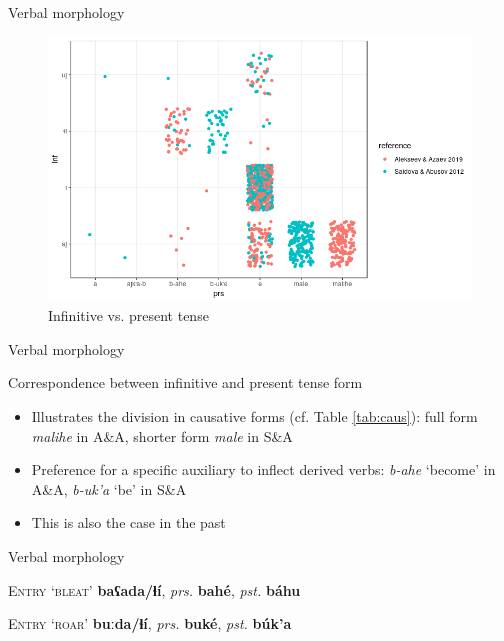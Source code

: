 \begin{frame}{Verbal morphology}

\begin{figure}[h]
\centering
\caption{Infinitive vs. present tense}
\includegraphics[scale=0.45]{images/infxprs.png}
\end{figure}

\end{frame}

\begin{frame}{Verbal morphology}

Correspondence between infinitive and present tense form

\begin{itemize}
    \item Illustrates the division in causative forms (cf. Table \ref{tab:caus}): full form \textit{malihe} in A\&A, shorter form \textit{male} in S\&A
    \pause
    \item Preference for a specific auxiliary to inflect derived verbs: \textit{b-ahe} `become' in A\&A, \textit{b-uk'a} `be' in S\&A
    \item This is also the case in the past
\end{itemize}
\end{frame}

\begin{frame}{Verbal morphology}

\textsc{Entry `bleat'} \textbf{baʕada/ɬí}, \textit{prs.} \textbf{bahé}, \textit{pst.} \textbf{báhu} \citep{alekseev2019}


\pause
\vfill

\textsc{Entry `roar'} \textbf{buːda/ɬí}, \textit{prs.} \textbf{buké}, \textit{pst.} \textbf{búk'a} \citep{saidovaabusov2012}

\end{frame}

